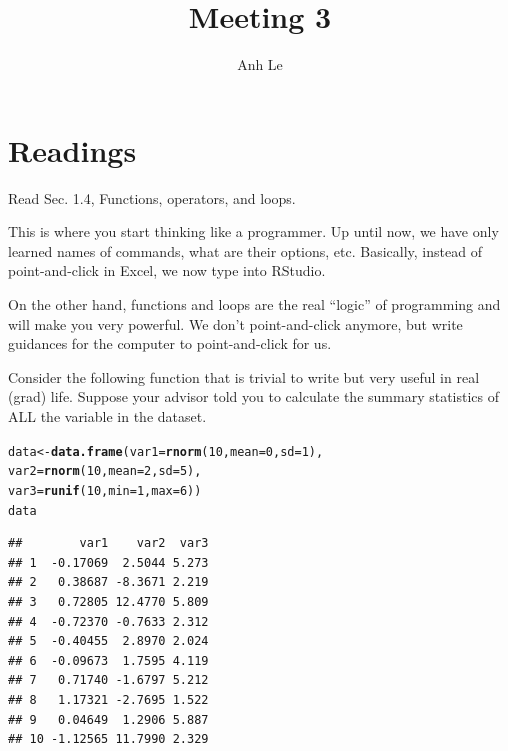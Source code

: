 \documentclass{article}\usepackage[]{graphicx}\usepackage[]{color}
\title{Meeting 3}
\author{Anh Le}
\makeatletter
\newcommand{\hlnum}[1]{\textcolor[rgb]{0.686,0.059,0.569}{#1}}%
\newcommand{\hlstd}[1]{\textcolor[rgb]{0.345,0.345,0.345}{#1}}%
\newcommand{\hlkwb}[1]{\textcolor[rgb]{0.69,0.353,0.396}{#1}}%
\newcommand{\hlkwc}[1]{\textcolor[rgb]{0.333,0.667,0.333}{#1}}%
\newcommand{\hlkwd}[1]{\textcolor[rgb]{0.737,0.353,0.396}{\textbf{#1}}}%
\newenvironment{kframe}{%
 \def\at@end@of@kframe{}%
 \ifinner\ifhmode%
  \def\at@end@of@kframe{\end{minipage}}%
  \begin{minipage}{\columnwidth}%
 \fi\fi%
 \def\FrameCommand##1{\hskip\@totalleftmargin \hskip-\fboxsep
 \colorbox{shadecolor}{##1}\hskip-\fboxsep
     \hskip-\linewidth \hskip-\@totalleftmargin \hskip\columnwidth}%
 \MakeFramed {\advance\hsize-\width
   \@totalleftmargin\z@ \linewidth\hsize
   \@setminipage}}%
 {\par\unskip\endMakeFramed%
 \at@end@of@kframe}
\newenvironment{knitrout}{}{} %
\makeatother
\begin{document}
\maketitle

\section{Readings}

Read Sec. 1.4, Functions, operators, and loops.

This is where you start thinking like a programmer. Up until now, we have only learned names of commands, what are their options, etc. Basically, instead of point-and-click in Excel, we now type into RStudio.

On the other hand, functions and loops are the real ``logic'' of programming and will make you very powerful. We don't point-and-click anymore, but write guidances for the computer to point-and-click for us.

Consider the following function that is trivial to write but very useful in real (grad) life. Suppose your advisor told you to calculate the summary statistics of ALL the variable in the dataset.

\begin{knitrout}
\color{fgcolor}\begin{kframe}
\begin{alltt}
\hlstd{data} \hlkwb{<-} \hlkwd{data.frame}\hlstd{(}\hlkwc{var1}\hlstd{=}\hlkwd{rnorm}\hlstd{(}\hlnum{10}\hlstd{,} \hlkwc{mean}\hlstd{=}\hlnum{0}\hlstd{,} \hlkwc{sd}\hlstd{=}\hlnum{1}\hlstd{),}
                   \hlkwc{var2}\hlstd{=}\hlkwd{rnorm}\hlstd{(}\hlnum{10}\hlstd{,} \hlkwc{mean}\hlstd{=}\hlnum{2}\hlstd{,} \hlkwc{sd}\hlstd{=}\hlnum{5}\hlstd{),}
                   \hlkwc{var3}\hlstd{=}\hlkwd{runif}\hlstd{(}\hlnum{10}\hlstd{,} \hlkwc{min}\hlstd{=}\hlnum{1}\hlstd{,} \hlkwc{max}\hlstd{=}\hlnum{6}\hlstd{))}
\hlstd{data}
\end{alltt}
\begin{verbatim}
##        var1    var2  var3
## 1  -0.17069  2.5044 5.273
## 2   0.38687 -8.3671 2.219
## 3   0.72805 12.4770 5.809
## 4  -0.72370 -0.7633 2.312
## 5  -0.40455  2.8970 2.024
## 6  -0.09673  1.7595 4.119
## 7   0.71740 -1.6797 5.212
## 8   1.17321 -2.7695 1.522
## 9   0.04649  1.2906 5.887
## 10 -1.12565 11.7990 2.329
\end{verbatim}
\end{kframe}
\end{knitrout}
\end{document}

